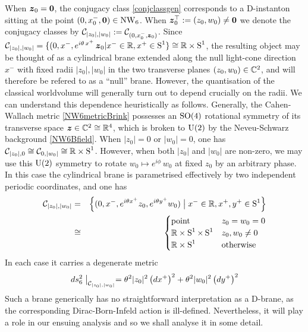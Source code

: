 When ${{\boldsymbol {z} }}_0={{\boldsymbol {0} }}$, the conjugacy class \eqref{conjclassgen} corresponds to a
D-instanton sitting at the point $(0,x_0^-,{\boldsymbol {0} })\in\operatorname{NW}_6$. When
${{\boldsymbol {z} }}_0^\top:=(z_0,w_0)\neq{\boldsymbol {0} }$ we denote the conjugacy classes by
$\mathcal{C}_{|z_0|,|w_0|}:=\mathcal{C}_{(0,x_0^-,{{\boldsymbol {z} }}_0)}$. Since
$\mathcal{C}_{|z_0|,|w_0|}=\{(0,x^-, e^{ i\theta\,x^+}\,{{\boldsymbol {z} }}_0|
x^-\in{\mathbb R},x^+\in\operatorname{S}^1\}\cong{\mathbb R}\times\operatorname{S}^1$, the resulting object may be
thought of as a cylindrical brane extended along the null light-cone direction
$x^-$ with fixed radii $|z_0|,|w_0|$ in the two transverse planes
$(z_0,w_0)\in{\mathbb C}^2$, and will therefore be refered to as a ``null'' brane.
However, the quantisation of the classical worldvolume will generally turn out
to depend crucially on the radii. We can understand this dependence
heuristically as follows. Generally, the Cahen-Wallach metric
\eqref{NW6metricBrink} possesses an ${\rm SO}(4)$ rotational symmetry of its
transverse space ${{\boldsymbol {z} }}\in{\mathbb C}^2\cong{\mathbb R}^4$, which is broken to ${\rm U}(2)$
by the Neveu-Schwarz background \eqref{NW6Bfield}. When $|z_0|=0$ or $|w_0|=0$,
one has $\mathcal{C}_{|z_0|,0}\cong\mathcal{C}_{0,|w_0|}\cong{\mathbb R}\times\operatorname{S}^1$.
However, when both $|z_0|$ and $|w_0|$ are non-zero, we may use this ${\rm
  U}(2)$ symmetry to rotate $w_0\mapsto e^{ i\phi}\,w_0$ at fixed $z_0$ by an
arbitrary phase. In this case the cylindrical brane is parametrised effectively
by two independent periodic coordinates, and one has
\begin{eqnarray}
  \label{cylnullbrane}
  \mathcal{C}_{|z_0|,|w_0|}&=&\left\{(0,x^-,e^{ i\theta x^+}z_0,  e^{ i\theta y^+}
    w_0) \bigm| x^-\in{\mathbb R}, x^+, y^+ \in\operatorname{S}^1\right\} \nonumber\\
  &\cong&
  \begin{cases}
      {\rm point} &z_0=w_0=0 \\
      {\mathbb R}\times\operatorname{S}^1\times\operatorname{S}^1 &z_0,w_0\neq0 \\
      {\mathbb R}\times\operatorname{S}^1 &{\rm otherwise}
    \end{cases}
\end{eqnarray}
In each case it carries a degenerate metric
\begin{equation}
  \label{degmetricnull}
  d s_6^2\bigm|_{\mathcal{C}_{|z_0|,|w_0|}}=\theta^2 |z_0|^2\left( d
    x^+\right)^2+\theta^2 |w_0|^2\left( d y^+\right)^2
\end{equation}
Such a brane generically has no straightforward interpretation as a D-brane, as
the corresponding Dirac-Born-Infeld action is ill-defined. Nevertheless, it will
play a role in our ensuing analysis and so we shall analyse it in some detail.

